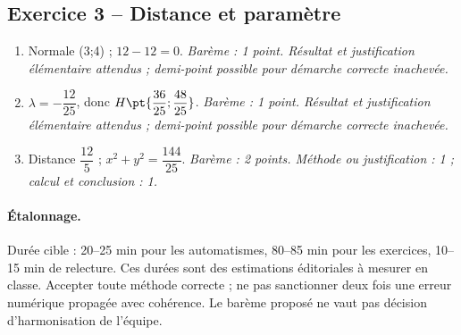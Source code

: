 \subsection*{Exercice 3 -- Distance et paramètre}
\begin{enumerate}
\item Normale (3;4) ; $12-12=0$. \textit{Barème : 1 point. Résultat et justification élémentaire attendus ; demi-point possible pour démarche correcte inachevée.}
\item $\lambda =-\dfrac{12}{25}$, donc $H\pt{\dfrac{36}{25};\dfrac{48}{25}}$. \textit{Barème : 1 point. Résultat et justification élémentaire attendus ; demi-point possible pour démarche correcte inachevée.}
\item Distance $\dfrac{12}{5}$ ; $x^2+y^2=\dfrac{144}{25}$. \textit{Barème : 2 points. Méthode ou justification : 1 ; calcul et conclusion : 1.}
\end{enumerate}
\paragraph{Étalonnage.} Durée cible : 20–25 min pour les automatismes, 80–85 min pour les exercices, 10–15 min de relecture. Ces durées sont des estimations éditoriales à mesurer en classe. Accepter toute méthode correcte ; ne pas sanctionner deux fois une erreur numérique propagée avec cohérence. Le barème proposé ne vaut pas décision d’harmonisation de l’équipe.
